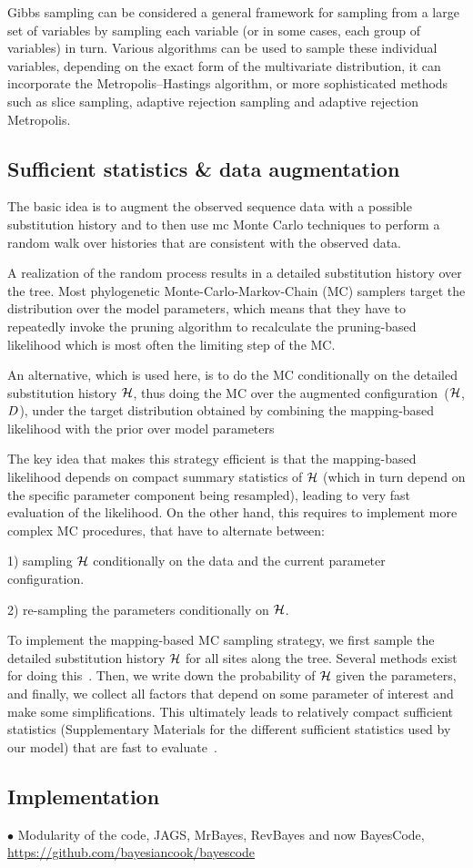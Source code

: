 Gibbs sampling can be considered a general framework for sampling from a large set of variables by sampling each variable (or in some cases, each group of variables) in turn.
Various algorithms can be used to sample these individual variables, depending on the exact form of the multivariate distribution, it can incorporate the Metropolis–Hastings algorithm, or more sophisticated methods such as slice sampling, adaptive rejection sampling and adaptive rejection Metropolis.

\subsection{Sufficient statistics \& data augmentation}

The basic idea is to augment the observed sequence data with a possible \gls{substitution} history and to then use \gls{mc} Monte Carlo techniques to perform a random walk over histories that are consistent with the observed data.

A realization of the random process results in a detailed \gls{substitution} history over the tree.
Most phylogenetic Monte-Carlo-Markov-Chain (\acrshort{MC}) samplers target the distribution over the model parameters, which means that they have to repeatedly invoke the pruning algorithm to recalculate
the pruning-based \gls{likelihood} which is most often the limiting step of the \acrshort{MC}.

An alternative, which is used here, is to do the \acrshort{MC} conditionally on the detailed \gls{substitution} history $\mathcal{H}$, thus doing the \acrshort{MC} over the augmented configuration~($\mathcal{H}$, $D$), under the target distribution obtained by combining the mapping-based \gls{likelihood} with the \gls{prior} over model parameters

The key idea that makes this strategy efficient is that the mapping-based \gls{likelihood} depends on
compact summary statistics of $\mathcal{H}$ (which in turn depend on the specific parameter component
being resampled), leading to very fast evaluation of the \gls{likelihood}.
On the other hand, this requires to implement more complex \acrshort{MC} procedures, that have to alternate between:

1) sampling $\mathcal{H}$ conditionally on the data and the current parameter configuration.

2) re-sampling the parameters conditionally on $\mathcal{H}$.

To implement the mapping-based \acrshort{MC} sampling strategy, we first sample the detailed \gls{substitution} history $\mathcal{H}$ for all sites along the tree.
Several methods exist for doing this~\citep{Nielsen2002,Rodrigue2008}.
Then, we write down the probability of $\mathcal{H}$ given the parameters, and finally, we collect all factors that depend on some parameter of interest and make some simplifications.
This ultimately leads to relatively compact sufficient statistics (Supplementary Materials for the different sufficient statistics used by our model) that are fast to evaluate~\citep{Irvahn2014,Davydov2016}.

\subsection{Implementation}

$\bullet$ Modularity of the code, JAGS, MrBayes, RevBayes and now BayesCode,
\url{https://github.com/bayesiancook/bayescode}